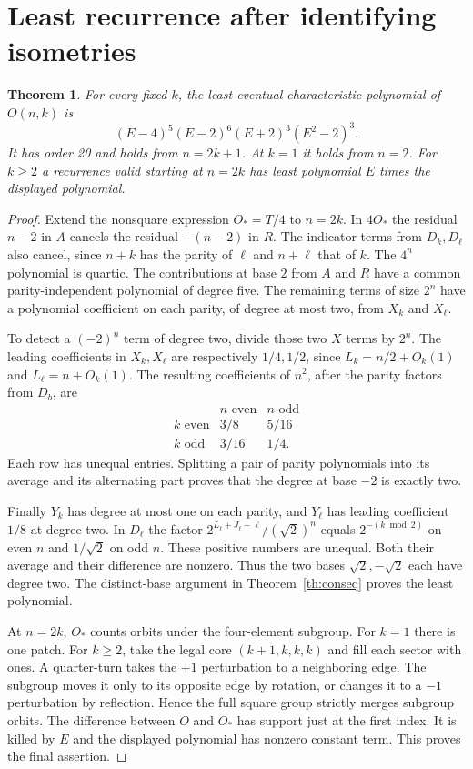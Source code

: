 \documentclass[11pt,letterpaper]{article}
\newtheorem{theorem}{Theorem}[section]
\begin{document}
\section{Least recurrence after identifying isometries}
\begin{theorem}\label{th:twenty}
For every fixed $k$, the least eventual characteristic polynomial of $O(n,k)$ is
\[
 \boxed{(E-4)^5(E-2)^6(E+2)^3(E^2-2)^3.}
\]
It has order 20 and holds from $n=2k+1$. At $k=1$ it holds from $n=2$. For $k\ge2$ a recurrence valid starting at $n=2k$ has least polynomial $E$ times the displayed polynomial.
\end{theorem}
\begin{proof}
Extend the nonsquare expression $O_*=T/4$ to $n=2k$. In $4O_*$ the residual $n-2$ in $A$ cancels the residual $-(n-2)$ in $R$. The indicator terms from $D_k,D_\ell$ also cancel, since $n+k$ has the parity of $\ell$ and $n+\ell$ that of $k$. The $4^n$ polynomial is quartic. The contributions at base $2$ from $A$ and $R$ have a common parity-independent polynomial of degree five. The remaining terms of size $2^n$ have a polynomial coefficient on each parity, of degree at most two, from $X_k$ and $X_\ell$.

To detect a $(-2)^n$ term of degree two, divide those two $X$ terms by $2^n$. The leading coefficients in $X_k,X_\ell$ are respectively $1/4,1/2$, since $L_k=n/2+O_k(1)$ and $L_\ell=n+O_k(1)$. The resulting coefficients of $n^2$, after the parity factors from $D_b$, are
\[
\begin{array}{c|cc}
 & n\text{ even} & n\text{ odd}\\ \hline
 k\text{ even} & 3/8 & 5/16\\
 k\text{ odd}  & 3/16 & 1/4 .
\end{array}
\]
Each row has unequal entries. Splitting a pair of parity polynomials into its average and its alternating part proves that the degree at base $-2$ is exactly two.

Finally $Y_k$ has degree at most one on each parity, and $Y_\ell$ has leading coefficient $1/8$ at degree two. In $D_\ell$ the factor $2^{L_\ell+J_\ell-\ell}/(\sqrt2)^n$ equals $2^{-(k\bmod2)}$ on even $n$ and $1/\sqrt2$ on odd $n$. These positive numbers are unequal. Both their average and their difference are nonzero. Thus the two bases $\sqrt2,-\sqrt2$ each have degree two. The distinct-base argument in Theorem~\ref{th:conseq} proves the least polynomial.

At $n=2k$, $O_*$ counts orbits under the four-element subgroup. For $k=1$ there is one patch. For $k\ge2$, take the legal core $(k+1,k,k,k)$ and fill each sector with ones. A quarter-turn takes the $+1$ perturbation to a neighboring edge. The subgroup moves it only to its opposite edge by rotation, or changes it to a $-1$ perturbation by reflection. Hence the full square group strictly merges subgroup orbits. The difference between $O$ and $O_*$ has support just at the first index. It is killed by $E$ and the displayed polynomial has nonzero constant term. This proves the final assertion.
\end{proof}
\end{document}
